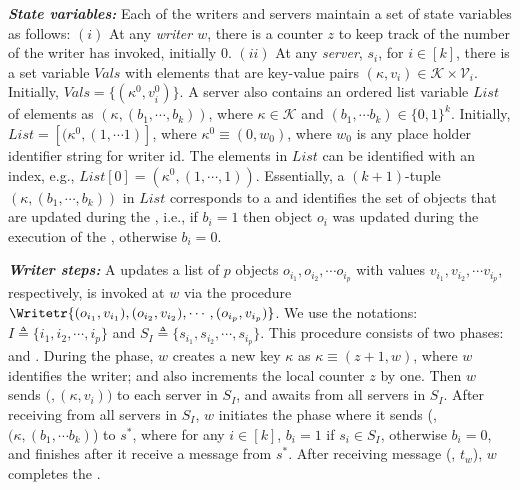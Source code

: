 \textit{\textbf{State variables:}} Each of the writers and servers maintain a set of state variables as follows: $(i)$ At  any  \emph{writer $w$}, there is  a counter $z$ to keep track of the
 number of \wot{}  the writer has  invoked, initially $0$. $(ii)$ At any  \emph{server}, $s_i$, 
 for $i \in [k]$, there is  a set variable $Vals$ 
 with elements 
 that are  key-value pairs $({\kappa}, v_i) \in \mathcal{K} \times \mathcal{V}_i$. Initially,
  $Vals= \{ ({\kappa}^0, v_i^0)\}$. %
A server also contains an
 ordered list variable $List$  of elements  as $({\kappa}, (b_1, \cdots, b_k))$,  where 
 ${\kappa}  \in \mathcal{K}$  and 
 $(b_1, \cdots b_k) \in  \{0, 1\}^k$. Initially,  
 $List= [ ({\kappa}^0, (1, \cdots 1) ]$, where ${\kappa}^0  \equiv (0, w_0)$, 
 where $w_0$ is any
  place holder identifier string for writer id. The elements in $List$ can be identified with an index, e.g., 
  $List[0] =({\kappa}^0, (1, \cdots, 1))$.  Essentially, a $(k+1)$-tuple  $(\kappa, (b_1, \cdots, b_k))$ in $List$ corresponds to a \wot{} and 
   identifies the set of objects that are updated during the \wot{}, i.e., if $b_i=1$ then object 
   $o_i$ was updated  during the execution of the  \wot{}, otherwise $b_i=0$.
					
\textit{\textbf{Writer steps:}} A \wot{} updates
			a  list of $p$ objects $o_{i_1}, o_{i_2}, \cdots o_{i_p}$  with values
			 $v_{i_1}, v_{i_2}, \cdots v_{i_p}$, respectively, is invoked at $w$ via the procedure
			$\Writetr{ (o_{i_1}, v_{i_1}), (o_{i_2}, v_{i_2}), \cdots, (o_{i_p}, v_{i_p}) }$.
We use the notations:  $I \triangleq \{i_1, i_2, \cdots, i_p\}$  and $S_I\triangleq \{s_{i_1}, s_{i_2}, \cdots, s_{i_p}\}$.
This procedure  consists of two phases: {\writeValue} and {\updateCoord}. 
During the {\writeValue} phase,  $w$ creates a new key ${\kappa}$ as 
 $ {\kappa}  \equiv (z + 1, w)$, where $w$ identifies the writer; and also increments the local counter $z$ by one.  Then $w$ sends $(${\writeValueTag}$, ({\kappa}, v_{i}))$ to each server in $S_I$, and awaits {\ackTag}  
from all servers in $S_I$.
After receiving {\ackTag} from all servers in $S_I$,  $w$
initiates the {\updateCoord} phase where it sends 
(\updateCoordTag, $({\kappa}, (b_{1}, \cdots b_{k})$) to $s^*$, where for any $i \in [k]$,  $b_i=1$ if $s_i \in S_I$, 
otherwise $b_i=0$,   and finishes after it receive a   {\ackTag} message from $s^*$.  
	  After receiving message  ({\ackTag}, $t_w$),  $w$ completes the \wot{}.

